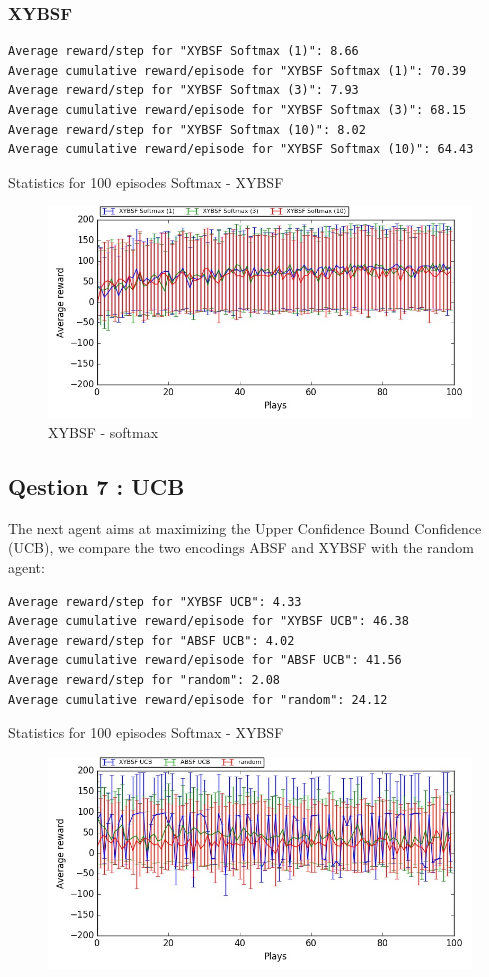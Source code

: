 \documentclass[11pt, a4paper]{article}
\begin{document}
\subsubsection*{XYBSF}
\begin{listing}
\begin{verbatim}
Average reward/step for "XYBSF Softmax (1)": 8.66
Average cumulative reward/episode for "XYBSF Softmax (1)": 70.39
Average reward/step for "XYBSF Softmax (3)": 7.93
Average cumulative reward/episode for "XYBSF Softmax (3)": 68.15
Average reward/step for "XYBSF Softmax (10)": 8.02
Average cumulative reward/episode for "XYBSF Softmax (10)": 64.43
\end{verbatim}
\caption{Statistics for 100 episodes Softmax - XYBSF}
\end{listing}

\begin{figure}[H]
\centering
\includegraphics[width=14cm]{XYBSF_sfmax_Learning}
\caption{XYBSF - softmax}
\end{figure}


\subsection*{Qestion 7 : UCB}
The next agent aims at maximizing the Upper Confidence Bound Confidence (UCB), we compare the two encodings ABSF and XYBSF with the random agent:
\begin{listing}
\begin{verbatim}
Average reward/step for "XYBSF UCB": 4.33
Average cumulative reward/episode for "XYBSF UCB": 46.38
Average reward/step for "ABSF UCB": 4.02
Average cumulative reward/episode for "ABSF UCB": 41.56
Average reward/step for "random": 2.08
Average cumulative reward/episode for "random": 24.12
\end{verbatim}
\caption{Statistics for 100 episodes Softmax - XYBSF}
\end{listing}

\begin{figure}[H]
\centering
\includegraphics[width=14cm]{UCB}
\caption{}
\end{figure}
\end{document}

